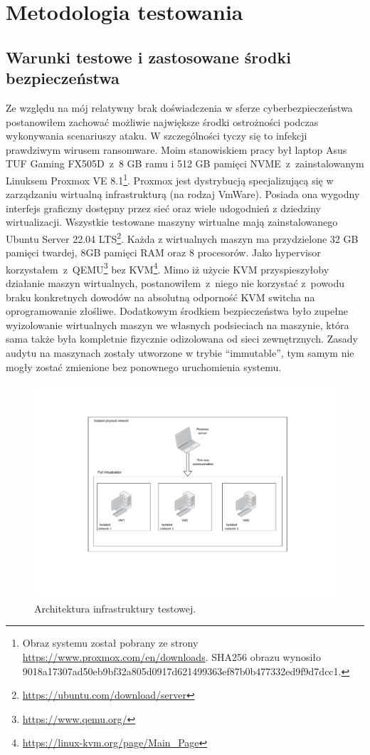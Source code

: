 \section{Metodologia testowania}
\subsection{Warunki testowe i zastosowane środki bezpieczeństwa}
Ze względu na mój relatywny brak doświadczenia w sferze cyberbezpieczeństwa postanowiłem 
zachować możliwie największe środki ostrożności podczas wykonywania scenariuszy ataku. W szczególności tyczy się to infekcji prawdziwym wirusem ransomware.\newline
Moim stanowiskiem pracy był laptop Asus TUF Gaming FX505D~z~8 GB ramu i 512 GB pamięci NVME~z~zainstalowanym Linuksem Proxmox VE 8.1\footnote{Obraz systemu został pobrany ze strony \url{https://www.proxmox.com/en/downloads}. SHA256 obrazu wynosiło 9018a17307ad50eb9bf32a805d0917d621499363ef87b0b477332ed9f9d7dcc1.}. Proxmox jest dystrybucją specjalizującą się w zarządzaniu wirtualną infrastrukturą (na rodzaj VmWare). Posiada ona wygodny interfejs graficzny dostępny przez sieć oraz wiele udogodnień z dziedziny wirtualizacji.
\newline
Wszystkie testowane maszyny wirtualne mają zainstalowanego Ubuntu Server 22.04 LTS\footnote{\url{https://ubuntu.com/download/server}}. Każda z wirtualnych maszyn ma przydzielone 32 GB pamięci twardej, 8GB pamięci RAM oraz 8 procesorów. Jako hypervisor korzystałem~z~QEMU\footnote{\url{https://www.qemu.org/}} bez KVM\footnote{\url{https://linux-kvm.org/page/Main_Page}}.
Mimo iż użycie KVM przyspieszyłoby działanie maszyn wirtualnych, postanowiłem~z~niego nie korzystać z~powodu braku konkretnych dowodów na absolutną odporność KVM switcha na oprogramowanie złośliwe. Dodatkowym środkiem bezpieczeństwa było zupełne wyizolowanie wirtualnych maszyn we własnych podsieciach na maszynie, która sama także była kompletnie fizycznie odizolowana od sieci zewnętrznych. Zasady audytu na maszynach zostały utworzone w trybie \foreignquote{english}{immutable}, tym samym nie mogły zostać zmienione bez ponownego uruchomienia systemu.
\begin{figure}[H]
    \centering
    \includegraphics[width=0.8\linewidth]{rysunki/test.drawio.pdf}
    \caption{Architektura infrastruktury testowej.}
    \label{fig:enter-label}
\end{figure}

